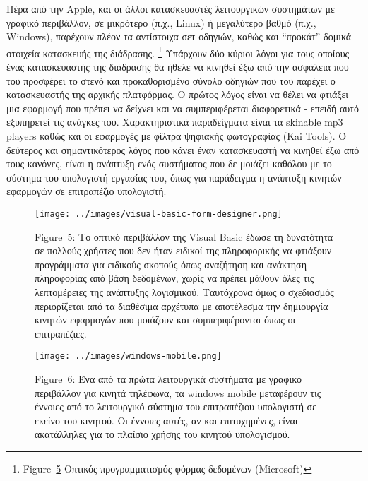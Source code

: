 \documentclass[
]{article}
\begin{document}
Πέρα από την Apple, και οι άλλοι κατασκευαστές λειτουργικών συστημάτων
με γραφικό περιβάλλον, σε μικρότερο (π.χ., Linux) ή μεγαλύτερο βαθμό
(π.χ., Windows), παρέχουν πλέον τα αντίστοιχα σετ οδηγιών, καθώς και
``προκάτ'' δομικά στοιχεία κατασκευής της διάδρασης. \footnote{Figure~\protect\hyperlink{fig:visual-basic-form-designer}{5}
  Οπτικός προγραμματισμός φόρμας δεδομένων (Microsoft)} Υπάρχουν δύο
κύριοι λόγοι για τους οποίους ένας κατασκευαστής της διάδρασης θα ήθελε
να κινηθεί έξω από την ασφάλεια που του προσφέρει το στενό και
προκαθορισμένο σύνολο οδηγιών που του παρέχει ο κατασκευαστής της
αρχικής πλατφόρμας. Ο πρώτος λόγος είναι να θέλει να φτιάξει μια
εφαρμογή που πρέπει να δείχνει και να συμπεριφέρεται διαφορετικά -
επειδή αυτό εξυπηρετεί τις ανάγκες του. Χαρακτηριστικά παραδείγματα
είναι τα skinable mp3 players καθώς και οι εφαρμογές με φίλτρα ψηφιακής
φωτογραφίας (Kai Tools). Ο δεύτερος και σημαντικότερος λόγος που κάνει
έναν κατασκευαστή να κινηθεί έξω από τους κανόνες, είναι η ανάπτυξη ενός
συστήματος που δε μοιάζει καθόλου με το σύστημα του υπολογιστή εργασίας
του, όπως για παράδειγμα η ανάπτυξη κινητών εφαρμογών σε επιτραπέζιο
υπολογιστή.

\leavevmode{}%
\begin{figure}
\hypertarget{fig:visual-basic-form-designer}{%
\centering
\texttt{[image: ../images/visual-basic-form-designer.png]}
\caption{Figure~5: Το οπτικό περιβάλλον της Visual Basic έδωσε τη
δυνατότητα σε πολλούς χρήστες που δεν ήταν ειδικοί της πληροφορικής να
φτιάξουν προγράμματα για ειδικούς σκοπούς όπως αναζήτηση και ανάκτηση
πληροφορίας από βάση δεδομένων, χωρίς να πρέπει μάθουν όλες τις
λεπτομέρειες της ανάπτυξης λογισμικού. Ταυτόχρονα όμως ο σχεδιασμός
περιορίζεται από τα διαθέσιμα αρχέτυπα με αποτέλεσμα την δημιουργία
κινητών εφαρμογών που μοιάζουν και συμπεριφέρονται όπως οι
επιτραπέζιες.}\label{fig:visual-basic-form-designer}
}
\end{figure}

\leavevmode{}%
\begin{figure}
\hypertarget{fig:windows-mobile}{%
\centering
\texttt{[image: ../images/windows-mobile.png]}
\caption{Figure~6: Ένα από τα πρώτα λειτουργικά συστήματα με γραφικό
περιβάλλον για κινητά τηλέφωνα, τα windows mobile μεταφέρουν τις έννοιες
από το λειτουργικό σύστημα του επιτραπέζιου υπολογιστή σε εκείνο του
κινητού. Οι έννοιες αυτές, αν και επιτυχημένες, είναι ακατάλληλες για το
πλαίσιο χρήσης του κινητού υπολογισμού.}\label{fig:windows-mobile}
}
\end{figure}
\end{document}
